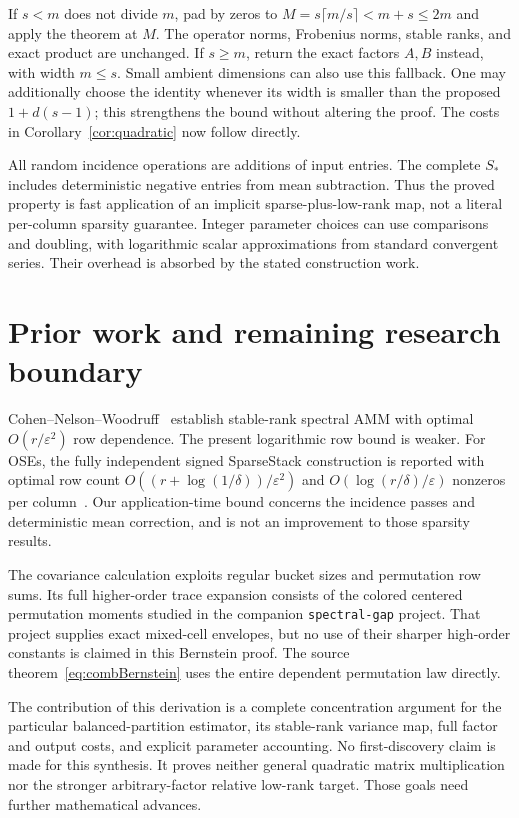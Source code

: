 \documentclass[11pt]{article}
\begin{document}
If $s<m$ does not divide $m$, pad by zeros to
$M=s\lceil m/s\rceil<m+s\le2m$ and apply the theorem at $M$.
The operator norms, Frobenius norms, stable ranks, and exact product
are unchanged. If $s\ge m$, return the exact factors $A,B$ instead,
with width $m\le s$. Small ambient dimensions can also use this fallback.
One may additionally choose the identity whenever its width is smaller
than the proposed $1+d(s-1)$; this strengthens the bound without altering
the proof. The costs in Corollary~\ref{cor:quadratic} now follow directly.

All random incidence operations are additions of input entries.
The complete $S_*$ includes deterministic negative entries from mean
subtraction. Thus the proved property is fast application of an implicit
sparse-plus-low-rank map, not a literal per-column sparsity guarantee.
Integer parameter choices can use comparisons and doubling, with
logarithmic scalar approximations from standard convergent series.
Their overhead is absorbed by the stated construction work.

\section{Prior work and remaining research boundary}
Cohen--Nelson--Woodruff~\cite{CNW} establish stable-rank spectral AMM
with optimal $O(r/\varepsilon^2)$ row dependence. The present logarithmic
row bound is weaker. For OSEs, the fully independent signed SparseStack
construction is reported with optimal row count
$O((r+\log(1/\delta))/\varepsilon^2)$ and
$O(\log(r/\delta)/\varepsilon)$ nonzeros per column~\cite{SparseStack}.
Our application-time bound concerns the incidence passes and deterministic
mean correction, and is not an improvement to those sparsity results.

The covariance calculation exploits regular bucket sizes and permutation
row sums. Its full higher-order trace expansion consists of the colored
centered permutation moments studied in the companion
\texttt{spectral-gap} project. That project supplies exact mixed-cell
envelopes, but no use of their sharper high-order constants is claimed
in this Bernstein proof. The source theorem~\eqref{eq:combBernstein}
uses the entire dependent permutation law directly.

The contribution of this derivation is a complete concentration argument
for the particular balanced-partition estimator, its stable-rank variance
map, full factor and output costs, and explicit parameter accounting.
No first-discovery claim is made for this synthesis. It proves neither
general quadratic matrix multiplication nor the stronger arbitrary-factor
relative low-rank target. Those goals need further mathematical advances.
\end{document}
